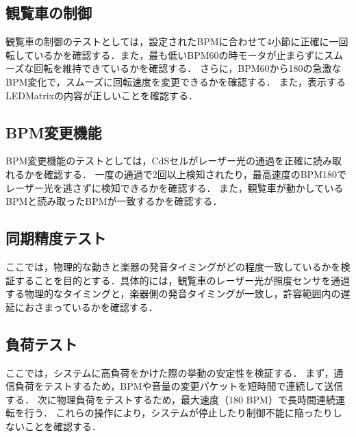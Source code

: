 \documentclass[lualatex,book,paper=a4paper,jafontsize=11.5pt,jafontscale=1.05]{jlreq}
\begin{document}
\subsection{観覧車の制御}
観覧車の制御のテストとしては，設定されたBPMに合わせて4小節に正確に一回転しているかを確認する．また，最も低いBPM60の時モータが止まらずにスムーズな回転を維持できているかを確認する．
さらに，BPM60から180の急激なBPM変化で，スムーズに回転速度を変更できるかを確認する．
また，表示するLEDMatrixの内容が正しいことを確認する．


\subsection{BPM変更機能}
BPM変更機能のテストとしては，CdSセルがレーザー光の通過を正確に読み取れるかを確認する．
一度の通過で2回以上検知されたり，最高速度のBPM180でレーザー光を逃さずに検知できるかを確認する．
また，観覧車が動かしているBPMと読み取ったBPMが一致するかを確認する．


\subsection{同期精度テスト}
ここでは，物理的な動きと楽器の発音タイミングがどの程度一致しているかを検証することを目的とする．具体的には，観覧車のレーザー光が照度センサを通過する物理的なタイミングと，楽器側の発音タイミングが一致し，許容範囲内の遅延におさまっているかを確認する．

\subsection{負荷テスト}
ここでは，システムに高負荷をかけた際の挙動の安定性を検証する．
まず，通信負荷をテストするため，BPMや音量の変更パケットを短時間で連続して送信する．
次に物理負荷をテストするため，最大速度（180 BPM）で長時間連続運転を行う．
これらの操作により，システムが停止したり制御不能に陥ったりしないことを確認する．





\end{document}
